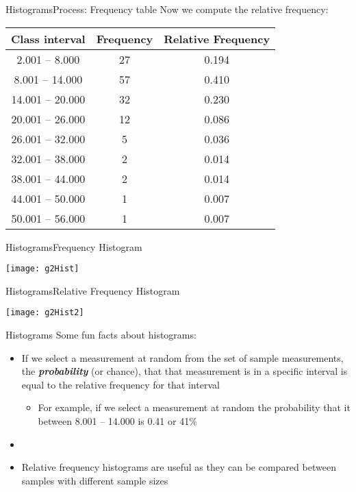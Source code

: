 \documentclass[xcolor=dvipsnames]{beamer}
\begin{document}
\begin{frame}{Histograms}{Process: Frequency table}
	Now we compute the relative frequency:
	\begin{center}
		\begin{tabular}{|c|c|c|}
			\hline
			\textbf{Class interval} & \textbf{Frequency} & \textbf{Relative Frequency} \\
			\hline \hline
			2.001 -- 8.000 & 27 & 0.194 \\ \hline 
			8.001 -- 14.000 & 57 & 0.410\\ \hline 
			14.001 -- 20.000 & 32 & 0.230\\ \hline 
			20.001 -- 26.000 & 12 & 0.086\\ \hline 
			26.001 -- 32.000 & 5 & 0.036\\ \hline 
			32.001 -- 38.000 & 2& 0.014\\ \hline 
			38.001 -- 44.000 & 2 & 0.014\\ \hline 
			44.001 -- 50.000 & 1& 0.007\\ \hline 
			50.001 -- 56.000 & 1& 0.007\\ \hline 
		\end{tabular}
	\end{center}
\end{frame}

\begin{frame}{Histograms}{Frequency Histogram}
\begin{center}
	\texttt{[image: g2Hist]}
\end{center}
\end{frame}

\begin{frame}{Histograms}{Relative Frequency Histogram}
	\begin{center}
		\texttt{[image: g2Hist2]}
	\end{center}
\end{frame}

\begin{frame}{Histograms}
Some fun facts about histograms: \pause
	\begin{itemize}
		\item If we select a measurement at random from the set of sample measurements, the \textbf{\emph{probability}} (or chance), that that measurement is in a specific interval is equal to the relative frequency for that interval \pause
		\begin{itemize}
			\item For example, if we select a measurement at random the probability that it between 8.001 -- 14.000 is 0.41 or 41\% \pause
		\end{itemize}
		\item[]
		\item Relative frequency histograms are useful as they can be compared between samples with different sample sizes
	\end{itemize}
\end{frame}
\end{document}
